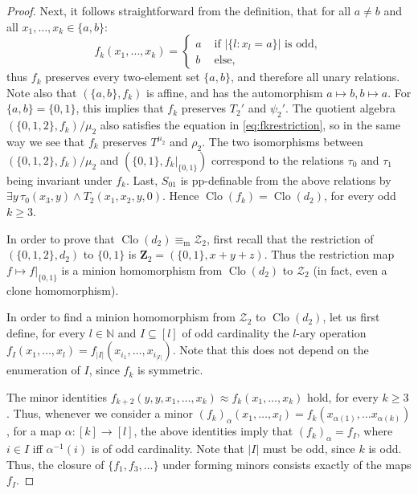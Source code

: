 \documentclass[12pt]{amsart}
\theoremstyle{definition}
\theoremstyle{definition}
\newcommand{\N}{\mathbb{N}}
\newcommand{\clo}[1]{\mathcal{#1}}
\DeclareMathOperator{\Clo}{Clo}
\newcommand{\minorequivalentto}{\equiv_{\mathrm{m}}}
\begin{document}
\begin{proof}
Next, it follows straightforward from the definition, that for all $a\neq b$ and all $x_1, \dots, x_{k} \in \{a,b\}$: 
\begin{equation} \label{eq:fkrestriction}
    f_k(x_1, \dots, x_{k})=\begin{cases}
        a & \text{ if } |\{l \colon x_{l}=a\}| \text{ is odd},\\     
        b & \text{ else},
    \end{cases}
\end{equation}
thus $f_k$ preserves every two-element set $\{a,b\}$, and therefore all unary relations. Note also that $(\{a,b\},f_k)$ is affine, and has the automorphism $a \mapsto b, b \mapsto a$. For $\{a,b\} = \{0,1\}$, this implies that $f_k$ preserves $T_2'$ and $\psi_2'$. The quotient algebra $(\{0,1,2\},f_k)/\mu_2$ also satisfies the equation in \eqref{eq:fkrestriction}, so in the same way we see that $f_k$ preserves $T^{\mu_2}$ and $\rho_2$. The two isomorphisms between $(\{0,1,2\},f_k)/\mu_2$ and $(\{0,1\},f_k|_{\{0,1\}})$ correspond to the relations $\tau_0$ and $\tau_1$ being invariant under $f_k$. Last, $S_{01}$ is pp-definable from the above relations by $\exists y \, \tau_0(x_3,y) \land T_2(x_1,x_2,y,0)$. Hence $\Clo(f_k) = \Clo(d_2)$, for every odd $k\geq 3$.

In order to prove that $\Clo(d_2) \minorequivalentto \clo{Z}_2$, first recall that the restriction of $(\{0,1,2\},d_2)$ to $\{0,1\}$ is $\mathbf Z_2 =(\{0,1\},x+y+z)$. Thus the restriction map $f \mapsto f|_{\{0,1\}}$ is a minion homomorphism from $\Clo(d_2)$ to $\clo{Z}_2$ (in fact, even a clone homomorphism).


In order to find a minion homomorphism from $\clo{Z}_2$ to $\Clo(d_2)$, let us first define, for every $l \in \N$ and $I \subseteq [l]$ of odd cardinality the $l$-ary operation $f_I(x_1,\ldots,x_l) = f_{|I|}(x_{i_1},\ldots,x_{i_{|I|}})$. Note that this does not depend on the enumeration of $I$, since $f_k$ is symmetric. 


The minor identities $f_{k+2}(y,y,x_1,\ldots,x_k) \approx f_{k}(x_1,\ldots,x_{k})$ hold, for every $k\geq 3$. Thus, whenever we consider a minor $(f_k)_\alpha(x_1,\ldots,x_l) = f_k(x_{\alpha(1)},\ldots x_{\alpha(k)})$, for a map $\alpha \colon [k] \to [l]$, the above identities imply that $(f_k)_\alpha = f_I$, where $i \in I$ iff $\alpha^{-1}(i)$ is of odd cardinality. Note that $|I|$ must be odd, since $k$ is odd. Thus, the closure of $\{f_1,f_3,\ldots\}$ under forming minors consists exactly of the maps $f_I$.


\end{proof}
\end{document}
